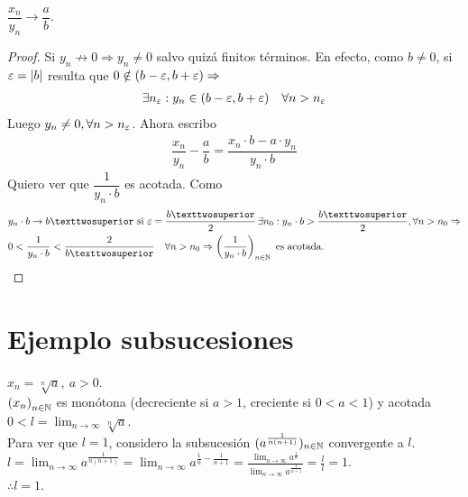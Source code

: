 \begin{prop}
  \(\dfrac{x_n}{y_n} \to \dfrac{a}{b} \).
  \begin{proof}
    Si \(y_n \not \to 0 \Rightarrow y_n \neq 0\) salvo quizá finitos términos. En efecto, como \(b \neq 0\), si \(\varepsilon = |b|\) resulta que \(0 \notin (b - \varepsilon, b + \varepsilon) \Rightarrow \)
    \begin{align*}
      \exists n_{\varepsilon} : y_n \in (b-\varepsilon, b+\varepsilon) \quad \forall n > n_{\varepsilon}
    \end{align*} Luego \(y_n \neq 0, \forall n > n_{\varepsilon} \). Ahora escribo \begin{align*}
      \dfrac{x_n}{y_n} - \dfrac{a}{b} = \dfrac{x_n \cdot b - a \cdot y_n}{y_n \cdot b}
    \end{align*} Quiero ver que \(\dfrac{1}{y_n \cdot b} \) es acotada. Como
    \begin{align*}
       & y_n \cdot b \to b² \text{ si } \e = \dfrac{b²}{2} \, \exists n_0 : y_n \cdot b > \dfrac{b²}{2}, \forall n > n_0 \Rightarrow                   \\
       & 0 < \dfrac{1}{y_n \cdot b} < \dfrac{2}{b²} \quad \forall n > n_0 \Rightarrow \left(\dfrac{1}{y_n \cdot b}\right)_{n \in \N} \text{ es acotada}.
    \end{align*}
  \end{proof}
\end{prop}

\section{Ejemplo subsucesiones}

\begin{eg}
  \(x_n = \sqrt[n]{a}, \ a > 0\). \\
  \({(x_n)}_{n \in \mathbb{N}} \) es monótona (decreciente si \(a > 1\), creciente si \(0 < a < 1\)) y acotada \(0 < l = \lim_{n \to \infty} \sqrt[n]{a} \). \\
  Para ver que \(l = 1\), considero la subsucesión \((a^{\frac{1}{n(n+1)}})_{n \in \mathbb{N}} \) convergente a \(l\). \\
  \(l = \lim_{n \to \infty} a^{\frac{1}{n(n+1)}} = \lim_{n \to \infty} a^{\frac{1}{n} - \frac{1}{n+1}} =
    \frac{\lim_{n \to \infty} a^{\frac{1}{n}}}{\lim_{n \to \infty} a^{\frac{1}{n+1}}} = \frac{l}{l} = 1.\) \\
  \(\therefore l = 1\).
\end{eg}

